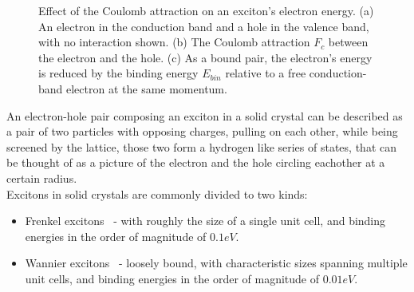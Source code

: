 \documentclass{article}
\begin{document}
\begin{figure}[H]
\begin{minipage}{0.32\linewidth}
    \end{minipage}
    \caption{Effect of the Coulomb attraction on an exciton's electron energy. (a) An electron in the conduction band and a hole in the valence band, with no interaction shown. (b) The Coulomb attraction $F_c$ between the electron and the hole. (c) As a bound pair, the electron's energy is reduced by the binding energy $E_{bin}$ relative to a free conduction-band electron at the same momentum.}
    \label{fig:exciton_binding_diagram}
\end{figure}

An electron-hole pair composing an exciton in a solid crystal can be described as a pair of two particles with opposing charges, pulling on each other, while being screened by the lattice, those two form a hydrogen like series of states, that can be thought of as a picture of the electron and the hole circling eachother at a certain radius.\\
Excitons in solid crystals are commonly divided to two kinds:
\begin{itemize}
    \item Frenkel excitons~\cite{frenkel1931transformation} - with roughly the size of a single unit cell, and binding energies in the order of magnitude of $0.1eV$.
    \item Wannier excitons~\cite{wannier1937structure} - loosely bound, with characteristic sizes spanning multiple unit cells, and binding energies in the order of magnitude of $0.01eV$.
\end{itemize}
\end{document}
